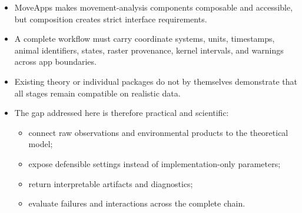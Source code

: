 \begin{itemize}
  \item MoveApps makes movement-analysis components composable and accessible, but composition creates strict interface requirements.
  \item A complete workflow must carry coordinate systems, units, timestamps, animal identifiers, states, raster provenance, kernel intervals, and warnings across app boundaries.
  \item Existing theory or individual packages do not by themselves demonstrate that all stages remain compatible on realistic data.
  \item The gap addressed here is therefore practical and scientific:
  \begin{itemize}
    \item connect raw observations and environmental products to the theoretical model;
    \item expose defensible settings instead of implementation-only parameters;
    \item return interpretable artifacts and diagnostics;
    \item evaluate failures and interactions across the complete chain.
  \end{itemize}
\end{itemize}
